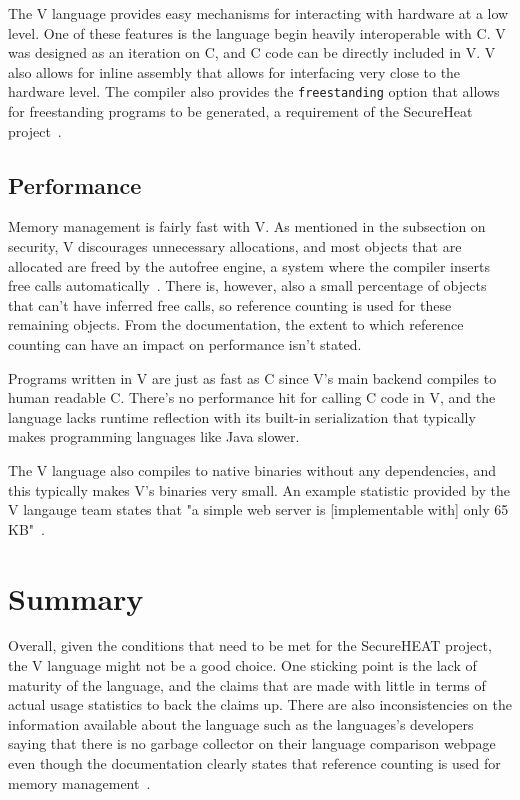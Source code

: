 \documentclass[letterpaper,twocolumn,10pt]{article}
\begin{document}
The V language provides easy mechanisms for interacting with hardware at a low level. One of these features is the language begin heavily interoperable with C. V was designed as an iteration on C, and C code can be directly included in V. V also allows for inline assembly that allows for interfacing very close to the hardware level. The compiler also provides the \texttt{freestanding} option that allows for freestanding programs to be generated, a requirement of the SecureHeat project~\cite{vdocs}.

\subsection{Performance}
Memory management is fairly fast with V. As mentioned in the subsection on security, V discourages unnecessary allocations, and most objects that are allocated are freed by the autofree engine, a system where the compiler inserts free calls automatically~\cite{vdocs}. There is, however, also a small percentage of objects that can't have inferred free calls, so reference counting is used for these remaining objects. From the documentation, the extent to which reference counting can have an impact on performance isn't stated.

Programs written in V are just as fast as C since V's main backend compiles to human readable C. There's no performance hit for calling C code in V, and the language lacks runtime reflection with its built-in serialization that typically makes programming languages like Java slower.

The V language also compiles to native binaries without any dependencies, and this typically makes V's binaries very small. An example statistic provided by the V langauge team states that "a simple web server is [implementable with] only 65 KB"~\cite{vlang}.

\section{Summary}
Overall, given the conditions that need to be met for the SecureHEAT project, the V language might not be a good choice. One sticking point is the lack of maturity of the language, and the claims that are made with little in terms of actual usage statistics to back the claims up. There are also inconsistencies on the information available about the language such as the languages's developers saying that there is no garbage collector on their language comparison webpage even though the documentation clearly states that reference counting is used for memory management~\cite{vcompare, vlang}.
\end{document}
